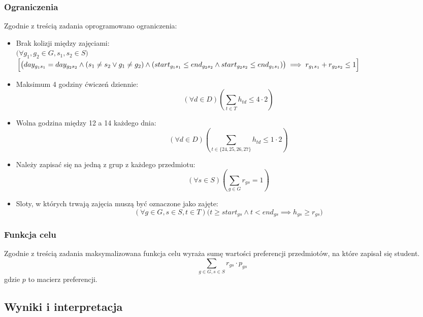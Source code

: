 \documentclass{article}
\begin{document}
\subsubsection{Ograniczenia}
Zgodnie z treścią zadania oprogramowano ograniczenia:
\begin{itemize}
\item Brak kolizji między zajęciami:\\ 
$\bigl(\forall g_1,g_2 \in G, s_1,s_2 \in S \bigr)$\\
$\Bigl[\bigl(day_{g_1 s_1} = day_{g_2 s_2} \land (s_1 \neq s_2 \lor g_1 \neq g_2) \land (start_{g_1 s_1} \leq end_{g_2 s_2} \land start_{g_2 s_2} \leq end_{g_1 s_1})\bigr) \implies r_{g_1 s_1} + r_{g_2 s_2} \leq 1 \Bigr]$
\item Maksimum 4 godziny ćwiczeń dziennie: \[(\forall d \in D) \left(\sum_{t \in T}{h_{td} \leq 4 \cdot 2}\right)\]
\item Wolna godzina między 12 a 14 każdego dnia: \[(\forall d \in D) \left(\sum_{t \in \{24,25,26,27\}}{h_{td}} \leq 1 \cdot 2\right)\]
\item Należy zapisać się na jedną z grup z każdego przedmiotu: \[(\forall s \in S)\left(\sum_{g \in G}{r_{gs}} = 1 \right)\]
\item Sloty, w których trwają zajęcia muszą być oznaczone jako zajęte: \[(\forall g \in G, s \in S, t \in T)\bigl(t \geq start_{gs} \land t < end_{gs} \implies h_{gs} \geq r_{gs}\bigr)\]
\end{itemize}

\subsubsection{Funkcja celu}
Zgodnie z treścią zadania maksymalizowana funkcja celu wyraża sumę wartości preferencji przedmiotów, na które zapisał się student.
\[\sum_{g \in G, s \in S}{r_{gs} \cdot p_{gs}}\]
gdzie $p$ to macierz preferencji.
\subsection{Wyniki i interpretacja}
\end{document}

